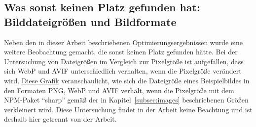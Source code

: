 \documentclass[11pt,a4paper]{article}
\begin{document}
\begin{landscape}
\section*{Was sonst keinen Platz gefunden hat: Bilddateigrößen und Bildformate}
\begin{multicols}{2}
  Neben den in dieser Arbeit beschriebenen Optimierungsergebnissen wurde eine weitere Beobachtung gemacht, die sonst keinen Platz gefunden hätte.
  Bei der Untersuchung von Dateigrößen im Vergleich zur Pixelgröße ist aufgefallen, dass sich WebP und AVIF unterschiedlich verhalten, wenn die Pixelgröße verändert wird.
  \href{https://quickchart.io/chart?w=400&h=400&c=%7B%0A%20%20type%3A%20%27line%27%2C%0A%20%20data%3A%20%7B%0A%20%20%20%20labels%3A%20%5B%0A%20%20%20%20%20%20%27Original%20(1900%20px)%27%2C%0A%20%20%20%20%20%20%27%401%20(1600%20px)%27%2C%0A%20%20%20%20%20%20%27%402%20(1280%20px)%27%2C%0A%20%20%20%20%20%20%27%403%20(960%20px)%27%2C%0A%20%20%20%20%20%20%27%404%20(640%20px)%27%2C%0A%20%20%20%20%20%20%27%405%20(320%20px)%27%2C%0A%20%20%20%20%5D%2C%0A%20%20%20%20datasets%3A%20%5B%0A%20%20%20%20%20%20%7B%0A%20%20%20%20%20%20%20%20label%3A%20%27PNG%27%2C%0A%20%20%20%20%20%20%20%20data%3A%20%5B689%2C2747%2C1743%2C972%2C443%2C130%5D%2C%0A%20%20%20%20%20%20%20%20backgroundColor%3A%20%27%23c4a7e755%27%2C%0A%20%20%20%20%20%20%20%20borderColor%3A%20%27%23c4a7e7%27%2C%0A%20%20%20%20%20%20%7D%2C%0A%20%20%20%20%20%20%7B%0A%20%20%20%20%20%20%20%20label%3A%20%27WebP%27%2C%0A%20%20%20%20%20%20%20%20data%3A%20%5B126%2C71%2C56%2C41%2C23%2C10%5D%2C%0A%20%20%20%20%20%20%20%20backgroundColor%3A%20%27%230400ff55%27%2C%0A%20%20%20%20%20%20%20%20borderColor%3A%20%27%230400ff%27%2C%0A%20%20%20%20%20%20%7D%2C%0A%20%20%20%20%20%20%7B%0A%20%20%20%20%20%20%20%20label%3A%20%27AVIF%27%2C%0A%20%20%20%20%20%20%20%20data%3A%20%5B374%2C36%2C28%2C20%2C13%2C6%5D%2C%0A%20%20%20%20%20%20%20%20backgroundColor%3A%20%27%23ffaa0055%27%2C%0A%20%20%20%20%20%20%20%20borderColor%3A%20%27%23ffaa00%27%2C%0A%20%20%20%20%20%20%7D%2C%0A%20%20%20%20%5D%2C%0A%20%20%7D%2C%0A%20%20options%3A%20%7B%0A%20%20%20%20scales%3A%20%7B%0A%20%20%20%20%20%20xAxes%3A%20%5B%7B%20scaleLabel%3A%20%7B%20display%3A%20true%2C%20labelString%3A%20%27Bildbreite%27%20%7D%20%7D%5D%2C%0A%20%20%20%20%20%20yAxes%3A%20%5B%7B%20scaleLabel%3A%20%7B%20display%3A%20true%2C%20labelString%3A%20%27kB%27%20%7D%20%7D%5D%2C%0A%20%20%20%20%7D%2C%0A%20%20%7D%2C%0A%7D}
  {Diese Grafik} veranschaulicht, wie sich die Dateigröße eines Beispielbildes in den Formaten PNG, WebP und AVIF verhält, wenn die Pixelgröße mit dem NPM-Paket \enquote{sharp} gemäß der in Kapitel~\ref{subsec:images} beschriebenen Größen verkleinert wird.
  Diese Untersuchung findet in der Arbeit keine Beachtung und ist deshalb hier getrennt von der Arbeit.
\end{multicols}

\end{landscape}
  
\end{document}
